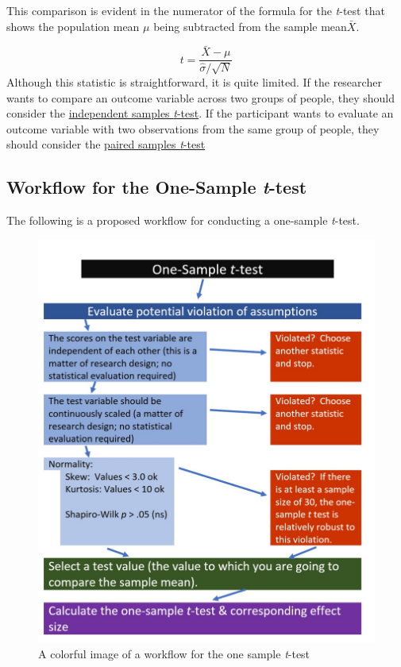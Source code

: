 \documentclass[
  11pt,
]{book}
\begin{document}
This comparison is evident in the numerator of the formula for the \emph{t}-test that shows the population mean \(\mu\) being subtracted from the sample mean\(\bar{X}\).

\[
t = \frac{\bar{X} - \mu}{\hat{\sigma}/\sqrt{N} }
\] Although this statistic is straightforward, it is quite limited. If the researcher wants to compare an outcome variable across two groups of people, they should consider the \protect\hyperlink{tIndSample}{independent samples \emph{t}-test}. If the participant wants to evaluate an outcome variable with two observations from the same group of people, they should consider the \protect\hyperlink{tPaired}{paired samples \emph{t}-test}

\hypertarget{workflow-for-the-one-sample-t-test}{%
\subsection{\texorpdfstring{Workflow for the One-Sample \emph{t}-test}{Workflow for the One-Sample t-test}}\label{workflow-for-the-one-sample-t-test}}

The following is a proposed workflow for conducting a one-sample \emph{t}-test.

\begin{figure}
\centering
\includegraphics{images/ttests/OneSampleWrkFlw.jpg}
\caption{A colorful image of a workflow for the one sample \emph{t}-test}
\end{figure}
\end{document}
